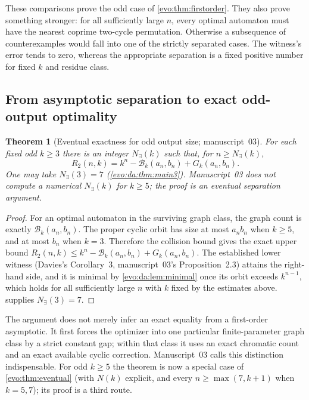 \documentclass[11pt,a4paper]{article}
\numberwithin{equation}{section}
\newtheorem{theorem}{Theorem}[section]
\theoremstyle{definition}
\theoremstyle{remark}
\newcommand{\Bip}{\mathcal B}
\begin{document}
These comparisons prove the odd case of \cref{evo:thm:firstorder}. They also
prove something stronger: for all sufficiently large $n$, every optimal
automaton must have the nearest coprime two-cycle permutation. Otherwise a
subsequence of counterexamples would fall into one of the strictly separated
cases. The witness's error tends to zero, whereas the appropriate separation
is a fixed positive number for fixed $k$ and residue class.

\subsection{From asymptotic separation to exact odd-output optimality}

\begin{theorem}[Eventual exactness for odd output size; manuscript~03]\label{evo:da:thm:odd}
For each fixed odd $k\ge3$ there is an integer $N_\exists(k)$ such that, for
$n\ge N_\exists(k)$,
\begin{equation}\label{evo:da:eq:oddexact}
 R_2(n,k)=k^n-\Bip_k(a_n,b_n)+G_k(a_n,b_n).
\end{equation}
One may take $N_\exists(3)=7$ (\cref{evo:da:thm:main3}). Manuscript~03 does
not compute a numerical $N_\exists(k)$ for $k\ge5$; the proof is an eventual
separation argument.
\end{theorem}
\begin{proof}
For an optimal automaton in the surviving graph class, the graph count is
exactly $\Bip_k(a_n,b_n)$. The proper cyclic orbit has size at most
$a_nb_n$ when $k\ge5$, and at most $b_n$ when $k=3$. Therefore the collision
bound gives the exact upper bound
$R_2(n,k)\le k^n-\Bip_k(a_n,b_n)+G_k(a_n,b_n)$. The established lower witness
(Davies's Corollary~3, manuscript~03's Proposition~2.3) attains the
right-hand side, and it is minimal by \cref{evo:da:lem:minimal} once its orbit
exceeds $k^{n-1}$, which holds for all sufficiently large $n$ with $k$ fixed
by the estimates above.  supplies $N_\exists(3)=7$.
\end{proof}

The argument does not merely infer an exact equality from a first-order
asymptotic. It first forces the optimizer into one particular finite-parameter
graph class by a strict constant gap; within that class it uses an exact
chromatic count and an exact available cyclic correction. Manuscript~03 calls
this distinction indispensable. For odd $k\ge5$ the theorem is now a special
case of \cref{evo:thm:eventual} (with $N(k)$ explicit, and every
$n\ge\max(7,k+1)$ when $k=5,7$); its proof is a third route.
\end{document}
